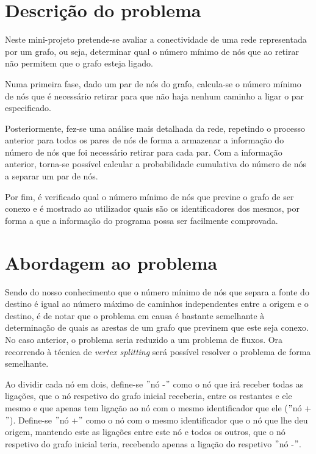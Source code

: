 \documentclass[a4paper]{article}
\begin{document}


\section{Descrição do problema}
Neste mini-projeto pretende-se avaliar a conectividade de uma rede representada por um grafo, ou seja, determinar qual o número mínimo de nós que ao retirar não permitem que o grafo esteja ligado.

Numa primeira fase, dado um par de nós do grafo, calcula-se o número mínimo de nós que é necessário retirar para que não haja nenhum caminho a ligar o par especificado. 

Posteriormente, fez-se uma análise mais detalhada da rede, repetindo o processo anterior para todos os pares de nós de forma a armazenar a informação do número de nós que foi necessário retirar para cada par.  Com a informação anterior, torna-se possível calcular a probabilidade cumulativa do número de nós a separar um par de nós.

Por fim, é verificado qual o número mínimo de nós que previne o grafo de ser conexo e é mostrado ao utilizador quais são os identificadores dos mesmos, por forma a que a informação do programa possa ser facilmente comprovada.

\section{Abordagem ao problema}
Sendo do nosso conhecimento que o número mínimo de nós que separa a fonte do destino é igual ao número máximo de caminhos independentes entre a origem e o destino, é de notar que o problema em causa é bastante semelhante à determinação de quais as arestas de um grafo que previnem que este seja conexo. No caso anterior, o problema seria reduzido a um problema de fluxos. Ora recorrendo à técnica de \textit{vertex splitting} será possível resolver o problema de forma semelhante.

Ao dividir cada nó em dois, define-se $"$nó -$"$ como o nó que irá receber todas as ligações, que o nó respetivo do grafo inicial receberia, entre os restantes e ele mesmo e que apenas tem ligação ao nó com o mesmo identificador que ele ($"$nó +$"$). Define-se $"$nó +$"$ como o nó com o mesmo identificador que o nó que lhe deu origem, mantendo este as ligações entre este nó e todos os outros, que o nó respetivo do grafo inicial teria, recebendo apenas a ligação do respetivo $"$nó -$"$.
\end{document}
